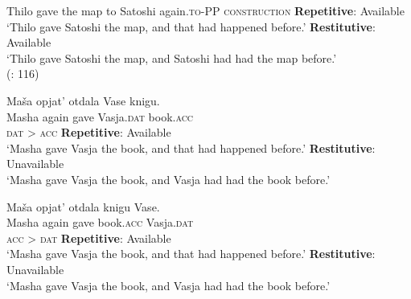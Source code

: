  \ea\label{ex:bondarenko:4}{Thilo gave the map to Satoshi again.}\hfill\textsc{to-PP construction}
\ea \textbf{Repetitive}: Available\\`Thilo gave Satoshi the map, and that had happened before.'
\ex \textbf{Restitutive}: Available\\`Thilo gave Satoshi the map, and Satoshi had had the map  before.'\\
\hfill (\citealt{Beck-Johnson2004}: 116)
\z
\z

 \ea\label{ex:bondarenko:5}
\gll Maša opjat’ otdala Vase knigu.\\
     Masha again gave Vasja.\textsc{dat} book.\textsc{acc}\\\hfill\textsc{dat} > \textsc{acc}
\ea \textbf{Repetitive}: Available\\`Masha gave Vasja the book, and that had happened before.'
\ex \textbf{Restitutive}: Unavailable\\`Masha gave Vasja the book, and Vasja had had the book   before.'
\z
\z

 \ea\label{ex:bondarenko:6}
\gll Maša opjat’ otdala knigu Vase.\\
     Masha again gave book.\textsc{acc} Vasja.\textsc{dat}\\\hfill\textsc{acc} > \textsc{dat}
\ea \textbf{Repetitive}: Available\\`Masha gave Vasja the book, and that had happened before.'
\ex \textbf{Restitutive}: Unavailable\\`Masha gave Vasja the book, and Vasja had had the book   before.'
\z
\z


